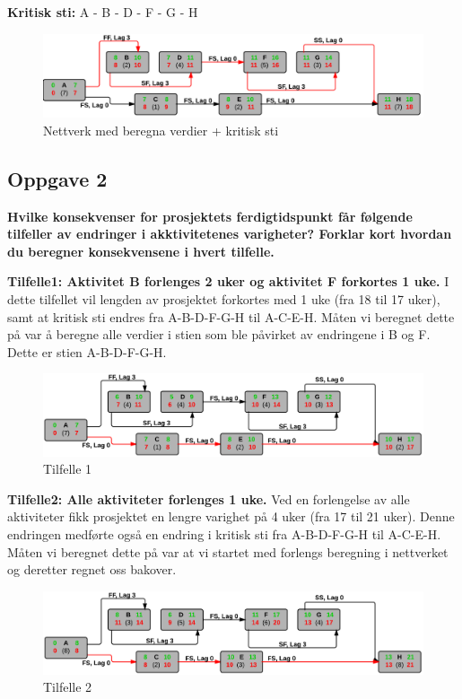 		{\bf Kritisk sti:} A - B - D - F - G - H

		\begin{figure}[H]
			\includegraphics[width=\textwidth]{task1.png}
			\caption{Nettverk med beregna verdier + kritisk sti}
		\end{figure}

		
	\clearpage
	\subsection*{Oppgave 2}
		{\bf Hvilke konsekvenser for prosjektets ferdigtidspunkt får følgende tilfeller av endringer i akktivitetenes varigheter? Forklar kort hvordan du beregner konsekvensene i hvert tilfelle.}

		{\bf Tilfelle1: Aktivitet B forlenges 2 uker og aktivitet F forkortes 1 uke.}
		I dette tilfellet vil lengden av  prosjektet forkortes med 1 uke (fra 18 til 17 uker),
		samt at kritisk sti endres fra A-B-D-F-G-H til A-C-E-H. Måten vi beregnet dette på var
		å beregne alle verdier i stien som ble påvirket av endringene i B og F. Dette er stien
		A-B-D-F-G-H.
		
		\begin{figure}[H]
			\includegraphics[width=\textwidth]{task2-1.png}
			\caption{Tilfelle 1}
		\end{figure}

		{\bf Tilfelle2: Alle aktiviteter forlenges 1 uke.}
		Ved en forlengelse av alle aktiviteter fikk prosjektet en lengre varighet på 4 uker 
		(fra 17 til 21 uker). Denne endringen medførte også en endring i kritisk sti fra 
		A-B-D-F-G-H til A-C-E-H. Måten vi beregnet dette på var at vi startet med forlengs beregning
		i nettverket og deretter regnet oss bakover. 

		\begin{figure}[H]
			\includegraphics[width=\textwidth]{task2-2.png}
			\caption{Tilfelle 2}
		\end{figure}

